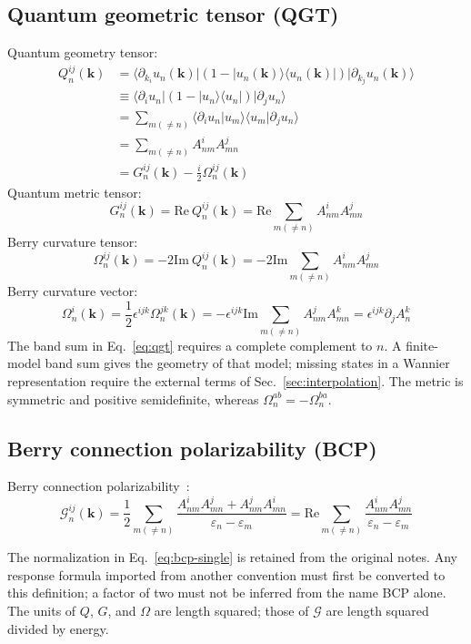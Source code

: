 \documentclass[prx,amsmath,amssymb,superscriptaddress,longbibliography]{revtex4-2}
\begin{document}
\subsection{Quantum geometric tensor (QGT)}
{\color{black}
Quantum geometry tensor: 
\begin{align}
     Q_{n}^{ij}(\bm{k}) &=  \langle{\partial_{k_i} u_n(\bm{k})}|(1 - |u_n(\bm{k})\rangle\langle{u_n(\bm{k})}|)|{\partial_{k_j} u_n(\bm{k})}\rangle \nonumber \\
     &\equiv \langle \partial_{i} u_n |(1 - |u_n\rangle\langle u_n |)|{\partial_{j} u_n}\rangle  \nonumber  \\
     &= \sum_{m(\neq n)}  \langle \partial_i u_n | u_m \rangle\langle u_m | \partial_j u_n \rangle \nonumber \\
     &= \sum_{m(\neq n)}  A_{nm}^i A_{mn}^j \nonumber \\
     &= G_n^{ij}(\bm{k}) - \frac{i}{2}\Omega_n^{ij}(\bm{k}) 
\label{eq:qgt}\end{align}
Quantum metric tensor: 
\begin{equation}
    G_{n}^{ij}(\bm{k}) = \mathrm{Re}~Q_{n}^{ij}(\bm{k}) = \mathrm{Re} \sum_{m(\neq n)}  A_{nm}^i A_{mn}^j
\label{eq:metric-curvature}\end{equation}
Berry curvature tensor:
\begin{equation}
    \Omega_{n}^{ij}(\bm{k}) = -2\mathrm{Im}~Q_{n}^{ij}(\bm{k}) = -2\mathrm{Im} \sum_{m(\neq n)}  A_{nm}^i A_{mn}^j
\end{equation}
Berry curvature vector:
\begin{equation}
    \Omega_{n}^{i}(\bm{k}) = \frac{1}{2}\epsilon^{ijk}\Omega_{n}^{jk}(\bm{k}) = -\epsilon^{ijk}\mathrm{Im} \sum_{m(\neq n)}  A_{nm}^j A_{mn}^k = \epsilon^{ijk} \partial_j A_n^k
\label{eq:curvature-vector}\end{equation}
}
The band sum in Eq.~\eqref{eq:qgt} requires a complete complement to $n$.
A finite-model band sum gives the geometry of that model; missing states in a
Wannier representation require the external terms of Sec.~\ref{sec:interpolation}.
The metric is symmetric and positive semidefinite, whereas
$\Omega_n^{ab}=-\Omega_n^{ba}$.

{\color{black}
\subsection{Berry connection polarizability (BCP)}

Berry connection polarizability~\cite{GaoPRL2014FieldInducedPositional}: 
\begin{equation}
    \mathcal{G}_n^{ij}(\bm{k}) = \frac{1}{2} \sum_{m(\neq n)}  \frac{A_{nm}^i A_{mn}^j + A_{nm}^j A_{mn}^i}{\varepsilon_n - \varepsilon_m} = \mathrm{Re}\sum_{m(\neq n)}  \frac{A_{nm}^i A_{mn}^j}{\varepsilon_n - \varepsilon_m}
\label{eq:bcp-single}\end{equation}

}
The normalization in Eq.~\eqref{eq:bcp-single} is retained from the original notes.
Any response formula imported from another convention must first be converted
to this definition; a factor of two must not be inferred from the name BCP alone.
The units of $Q$, $G$, and $\Omega$ are length squared; those of
$\mathcal G$ are length squared divided by energy.
\end{document}
